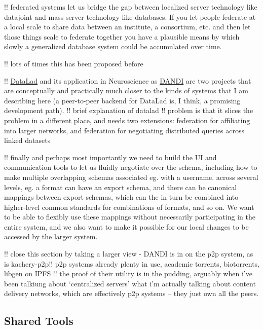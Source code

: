\documentclass[11pt]{article}
\begin{document}
\begin{multicols}{2}
!! federated systems let us bridge the gap between localized server
technology like datajoint and mass server technology like databases. If
you let people federate at a local scale to share data between an
institute, a consortium, etc. and then let those things scale to
federate together you have a plausible means by which slowly a
generalized database system could be accumulated over time.

!! lots of times this has been proposed before \cite{simaEnablingSemanticQueries2019
djokic-petrovicPIBASFedSPARQLWebbased2017
hasnainBioFedFederatedQuery2017} 

!! \href{https://www.datalad.org/}{DataLad} \cite{halchenkoDataLadDistributedSystem2021}  and its application in
Neuroscience as \href{https://dandiarchive.org}{DANDI} are two projects
that are conceptually and practically much closer to the kinds of
systems that I am describing here (a peer-to-peer backend for DataLad
is, I think, a promising development path). !! brief explanation of
datalad !! problem is that it slices the problem in a different place,
and needs two extensions: federation for affiliating into larger
networks, and federation for negotiating distributed queries across
linked datasets

!! finally and perhaps most importantly we need to build the UI and
communication tools to let us fluidly negotiate over the schema,
including how to make multiple overlapping schemas associated eg. with a
username. across several levels, eg. a format can have an export schema,
and there can be canonical mappings between export schemas, which can
the in turn be combined into higher-level common standards for
combinations of formats, and so on. We want to be able to flexibly use
these mappings without necessarily participating in the entire system,
and we also want to make it possible for our local changes to be
accessed by the larger system.

!! close this section by taking a larger view - \cite{langilleBioTorrentsFileSharing2010}  DANDI is in on the p2p system,
as is kachery-p2p!! p2p systems already plenty in use, academic
torrents, biotorrents, libgen on IPFS !! the proof of their utility is
in the pudding, arguably when i've been talkiung about `centralized
servers' what i'm actually talking about content delivery networks,
which are effectively p2p systems -- they just own all the peers.


\end{multicols}


\hypertarget{shared-tools}{%
\subsection{Shared Tools}\label{shared-tools}}
\end{document}
